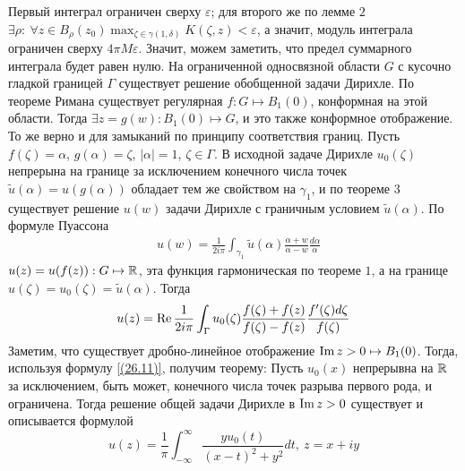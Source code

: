Первый интеграл ограничен сверху $\varepsilon$; для второго же по лемме $2$
$\exists \rho: \ \forall z \in B_\rho(z_0) \max_{\zeta \in
  \gamma(1,\delta)}K(\zeta,z) <\varepsilon$, а значит, модуль интеграла
ограничен сверху $4\pi M \varepsilon$. Значит, можем заметить, что предел
суммарного интеграла будет равен нулю.
\theorem
На ограниченной односвязной области $G$ с кусочно гладкой границей $\Gamma$
существует решение обобщенной задачи Дирихле.
\pr
По теореме Римана существует регулярная $f: G \mapsto B_1(0)$, конформная на
этой области. Тогда $\exists z=g(w): B_1(0) \mapsto G$, и это также конформное
отображение.
\\
То же верно и для замыканий по принципу соответствия границ. Пусть $f(\zeta) =
\alpha$, $g(\alpha) = \zeta$, $\left| \alpha \right|= 1$, $\zeta \in \Gamma$. В
исходной задаче Дирихле $u_0(\zeta)$ непрерына на границе за исключением
конечного числа точек $\tilde{u}(\alpha) = u(g(\alpha))$ обладает тем же
свойством на $\gamma_1$, и по теореме $3$ существует решение $u(w)$ задачи
Дирихле с граничным условием $\tilde{u}(\alpha)$. По формуле Пуассона
\begin{align*}
  & u(w) = \frac{1}{2i\pi}\int_{\gamma_1}\tilde{u}(\alpha)\frac{\alpha + w}{\alpha - w} \frac{d\alpha}{\alpha}
\end{align*}
$u(z) = u(f(z)): G \mapsto \mathbb{R}$, эта функция гармоническая по теореме $1$, а на
границе $u(\zeta) = u_0(\zeta) = \tilde{u}(\alpha)$. Тогда
\begin{equation}\label{(26.11)}
    u(z) = \mathrm{Re}\, \frac{1}{2i\pi}\int_{\Gamma}u_0(\zeta)\frac{f(\zeta)+f(z)}{f(\zeta) - f(z)} \frac{f'(\zeta)d\zeta}{f(\zeta)}
\end{equation}
Заметим, что существует дробно-линейное отображение $\mathrm{Im}\, z > 0 \mapsto B_1(0)$.
Тогда, используя формулу \eqref{(26.11)}, получим теорему:
\theorem
Пусть $u_0(x)$ непрерывна на $\mathbb{R}$ за исключением, быть может, конечного числа
точек разрыва первого рода, и ограничена. Тогда решение общей задачи Дирихле в
$\mathrm{Im}\, z > 0$ существует и описывается формулой
\begin{equation}\label{(26.12)}
    u(z) = \frac{1}{\pi}\int_{-\infty}^\infty \frac{y u_0(t)}{(x-t)^2 +y^2} dt, \ z = x+iy
\end{equation}
